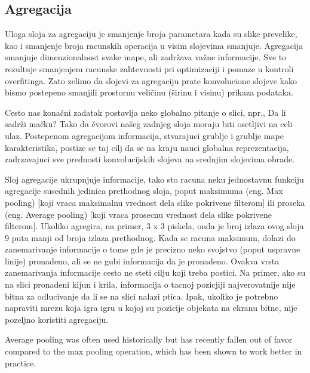 \documentclass[a4paper]{article}
\begin{document}
\newpage

\subsection{Agregacija}


Uloga sloja za agregaciju je smanjenje broja parametara kada su slike prevelike, kao i smanjenje broja racunskih operacija u visim slojevima smanjuje. Agregacija smanjuje dimenzionalnost svake mape, ali zadržava važne informacije. Sve to rezultuje smanjenjem racunske zahtevnosti pri optimizaciji i pomaze u kontroli overfitinga. Zato zelimo da slojevi za agregaciju prate konvolucione slojeve kako bismo postepeno smanjili prostornu veličinu (širinu i visinu) prikaza podataka.

Cesto nas konačni zadatak postavlja neko globalno pitanje o slici, npr., Da li sadrži mačku? Tako da čvorovi našeg zadnjeg sloja moraju biti osetljivi na celi ulaz. Postepenom agregacijom informacija, stvarajuci grublje i grublje mape karakteristika, postize se taj cilj da se na kraju nauci globalna reprezentacija, zadrzavajuci sve prednosti konvolucijskih slojeva na srednjim slojevima obrade.

Sloj agregacije ukrupnjuje informacije, tako sto racuna neku jednostavnu funkciju agregacije susednih jedinica prethodnog sloja, poput maksimuma (eng. Max pooling) [koji vraca maksimalnu vrednost dela slike pokrivene filterom] ili proseka (eng. Average pooling) [koji vraca prosecnu vrednost dela slike pokrivene filterom]. Ukoliko agregira, na primer, 3 x 3 piskela, onda je broj izlaza ovog sloja 9 puta manji od broja izlaza prethodnog. Kada se racuna maksimum, dolazi do zanemarivanje informacije o tome gde je precizno neko svojstvo (poput uspravne linije) pronadeno, ali se ne gubi informacija da je pronadeno. Ovakva vrsta zanemarivanja informacije cesto ne steti cilju koji treba postici. Na primer, ako su na slici pronadeni kljun i krila, informacija o tacnoj pozicjiji najverovatnije nije bitna za odlucivanje da li se na slici nalazi ptica. Ipak, ukoliko je potrebno napraviti mrezu koja igra igru u kojoj su pozicije objekata na ekranu bitne, nije pozeljno koristiti agregaciju.

 Average pooling was often used historically but has recently fallen out of favor compared to the max pooling operation, which has been shown to work better in practice.
 
\end{document}
